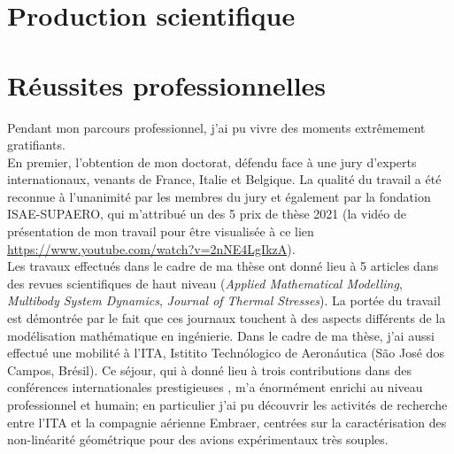 \documentclass[12pt, french]{article}
\begin{document}
	
	\section{Production scientifique}
	{
		
		
	}
	
	
	\section{Réussites professionnelles}
	
	Pendant mon parcours professionnel, j'ai pu vivre des moments extrêmement gratifiants. \\
	
	En premier, l'obtention de mon doctorat, défendu face à une jury d'experts internationaux, venants de France, Italie et Belgique. La qualité du travail a été reconnue à l'unanimité par les membres du jury et également par la fondation ISAE-SUPAERO, qui m'attribué un des 5 prix de thèse 2021 (la vidéo de présentation de mon travail pour être visualisée à ce lien \url{https://www.youtube.com/watch?v=2nNE4LgIkzA}). \\
	
	Les travaux effectués dans le cadre de ma thèse ont donné lieu à 5 articles dans des revues scientifiques de haut niveau  (\textit{Applied Mathematical Modelling}, \textit{Multibody System Dynamics}, \textit{Journal of Thermal Stresses}). La portée du travail est démontrée par le fait que ces journaux touchent à des aspects différents de la modélisation mathématique en ingénierie. Dans le cadre de ma thèse, j'ai aussi effectué une  mobilité à l'ITA, Istitito Techn\'ologico de Aeron\'autica (São José dos Campos, Brésil). Ce séjour, qui à donné lieu à trois contributions dans des conférences internationales prestigieuses , m'a énormément enrichi au niveau professionnel et humain; en particulier j'ai pu découvrir les activités de recherche entre l'ITA et la compagnie aérienne Embraer, centrées sur la caractérisation des non-linéarité géométrique pour des avions expérimentaux très souples.  \\
	
\end{document}
